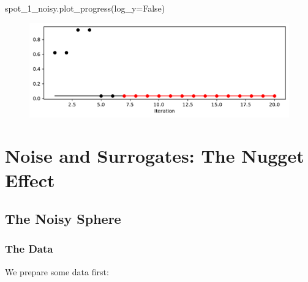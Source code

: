 \documentclass[
  letterpaper,
  DIV=11,
  numbers=noendperiod]{scrreprt}
\newenvironment{Shaded}{\begin{snugshade}}{\end{snugshade}}
\newcommand{\NormalTok}[1]{\textcolor[rgb]{0.00,0.23,0.31}{#1}}
\newcommand{\OperatorTok}[1]{\textcolor[rgb]{0.37,0.37,0.37}{#1}}
\newcommand{\VariableTok}[1]{\textcolor[rgb]{0.07,0.07,0.07}{#1}}
\begin{document}
\begin{Shaded}
\begin{Highlighting}[]
\NormalTok{spot\_1\_noisy.plot\_progress(log\_y}\OperatorTok{=}\VariableTok{False}\NormalTok{)}
\end{Highlighting}
\end{Shaded}

\begin{figure}[H]

{\centering \includegraphics{014_num_spot_ocba_files/figure-pdf/cell-8-output-1.pdf}

}

\end{figure}

\hypertarget{noise-and-surrogates-the-nugget-effect-1}{%
\section{Noise and Surrogates: The Nugget
Effect}\label{noise-and-surrogates-the-nugget-effect-1}}

\hypertarget{the-noisy-sphere-1}{%
\subsection{The Noisy Sphere}\label{the-noisy-sphere-1}}

\hypertarget{the-data-1}{%
\subsubsection{The Data}\label{the-data-1}}

We prepare some data first:
\end{document}
